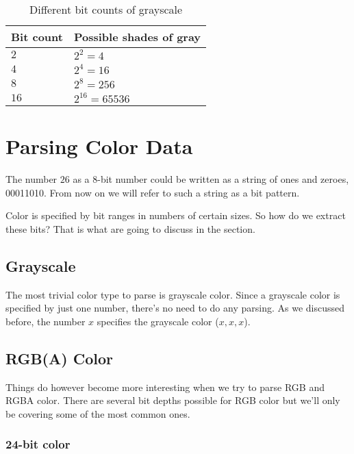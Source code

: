 \begin{table}
  \centering
  \begin{tabular}{ll}
    \toprule
    Bit count & Possible shades of gray \\
    \midrule
    $2$ & $2^2 = 4$ \\
    $4$ & $2^4 = 16$ \\
    $8$ & $2^8 = 256$ \\
    $16$ & $2^{16} = 65536$ \\
    \bottomrule
  \end{tabular}
  \caption{Different bit counts of grayscale}
  \label{tab:grayscale}
\end{table}

\section{Parsing Color Data}
\label{sec:parsing-color-data}

The number $26$ as a 8-bit number could be written as a string of
ones and zeroes, 00011010. From now on we will refer to such a
string as a bit pattern.

Color is specified by bit ranges in numbers of certain
sizes. So how do we extract these bits? That is what are going to
discuss in the section.

\subsection{Grayscale}

The most trivial color type to parse is grayscale color. Since a
grayscale color is specified by just one number, there's no need to
do any parsing. As we discussed before, the number $x$ specifies the
grayscale color \mbox{($x,x,x$)}. 

\subsection{RGB(A) Color}

Things do however become more interesting when we try to parse RGB
and RGBA color. There are several bit depths possible for RGB
color but we'll only be covering some of the most common ones.

\subsubsection{24-bit color}

